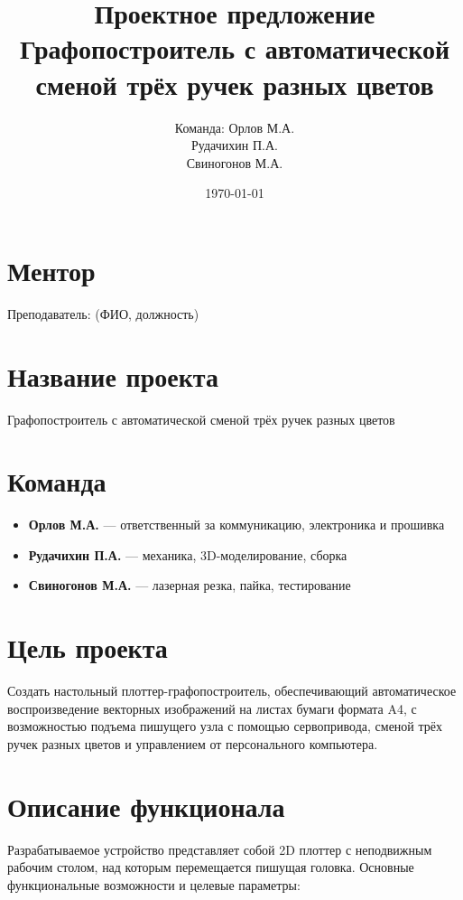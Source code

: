 \documentclass[a4paper,12pt]{article}
\title{\textbf{Проектное предложение}\\ \large{Графопостроитель с автоматической сменой трёх ручек разных цветов}}
\author{Команда: Орлов М.А. \\ 
	Рудачихин П.А. \\ 
	Свиногонов М.А.}
\date{\today}
\begin{document}
	
\maketitle
	
\section*{Ментор}
Преподаватель: \underline{\hspace{5cm}} (ФИО, должность)
	
\section{Название проекта}
Графопостроитель с автоматической сменой трёх ручек разных цветов
	
\section{Команда}
\begin{itemize}[leftmargin=*]
	\item \textbf{Орлов М.А.} — ответственный за коммуникацию, электроника и прошивка
	\item \textbf{Рудачихин П.А.} — механика, 3D-моделирование, сборка
	\item \textbf{Свиногонов М.А.} — лазерная резка, пайка, тестирование
\end{itemize}
	
\section{Цель проекта}
Создать настольный плоттер-графопостроитель, обеспечивающий автоматическое воспроизведение векторных изображений на листах бумаги формата A4, с возможностью подъема пишущего узла с помощью сервопривода, сменой трёх ручек разных цветов и управлением от персонального компьютера.
	
\section{Описание функционала}
Разрабатываемое устройство представляет собой 2D плоттер с неподвижным рабочим столом, над которым перемещается пишущая головка. Основные функциональные возможности и целевые параметры:
	
\end{document}
